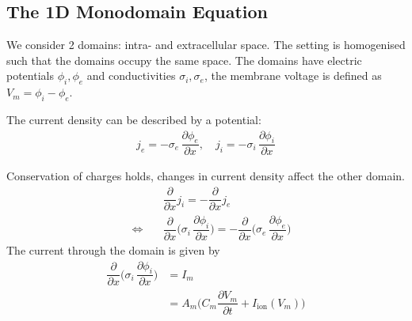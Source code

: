 \subsection{The 1D Monodomain Equation}

We consider 2 domains: intra- and extracellular space. The setting is homogenised such that the domains occupy the same space.
The domains have electric potentials $\phi_i, \phi_e$ and conductivities $\sigma_i, \sigma_e$, the membrane voltage is defined as $V_m = \phi_i-\phi_e$.
%  
\begin{figure}
  \def\svgwidth{6cm}
  \quad
\end{figure}
The current density can be described by a potential:
% 
\begin{equation*}
\begin{array}{lll}
j_e = -\sigma_e\,\dfrac{\partial\phi_e}{\partial x},\quad j_i = -\sigma_i\,\dfrac{\partial\phi_i}{\partial x}
\end{array}
\end{equation*}

\begin{figure}
  \def\svgwidth{6cm}
  \quad
\end{figure}
Conservation of charges holds, changes in current density affect the other domain.
%
\begin{equation}\label{eq:bidom1}
  \begin{array}{lll}
    &\dfrac{\partial}{\partial x} j_i = -\dfrac{\partial}{\partial x} j_e\\[4mm]
    \quad\Leftrightarrow\quad & \dfrac{\partial}{\partial x} \Big(\sigma_i\,\dfrac{\partial\phi_i}{\partial x}\Big) 
      = -\dfrac{\partial}{\partial x} \Big(\sigma_e\,\dfrac{\partial\phi_e}{\partial x}\Big)
  \end{array}
\end{equation}
The current through the domain is given by
\begin{equation}\label{eq:bidom2}
  \begin{array}{lll}
      \dfrac{\partial}{\partial x} \Big(\sigma_i\,\dfrac{\partial\phi_i}{\partial x}\Big)  &= I_m\\[4mm]
      &= A_m\Big(C_m \dfrac{\partial V_m}{\partial t} + I_\text{ion}(V_m)\Big)
  \end{array}
\end{equation}

